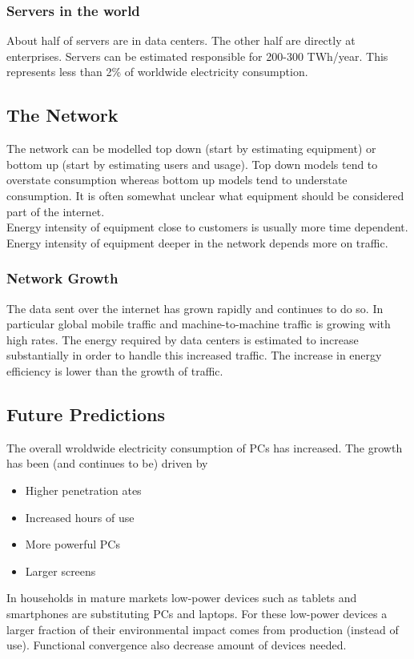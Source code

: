 \subsubsection{Servers in the world}
About half of servers are in data centers.
The other half are directly at enterprises.
Servers can be estimated responsible for 200-300 TWh/year.
This represents less than 2\% of worldwide electricity consumption.

\subsection{The Network}
The network can be modelled top down (start by estimating equipment) or bottom up (start by estimating users and usage).
Top down models tend to overstate consumption whereas bottom up models tend to understate consumption.
It is often somewhat unclear what equipment should be considered part of the internet.\\

Energy intensity of equipment close to customers is usually more time dependent.
Energy intensity of equipment deeper in the network depends more on traffic.

\subsubsection{Network Growth}
The data sent over the internet has grown rapidly and continues to do so.
In particular global mobile traffic and machine-to-machine traffic is growing with high rates.
The energy required by data centers is estimated to increase substantially in order to handle this increased traffic.
The increase in energy efficiency is lower than the growth of traffic.

\subsection{Future Predictions}
The overall wroldwide electricity consumption of PCs has increased.
The growth has been (and continues to be) driven by

\begin{itemize}
    \item Higher penetration ates
    \item Increased hours of use
    \item More powerful PCs
    \item Larger screens
\end{itemize}

In households in mature markets low-power devices such as tablets and smartphones are substituting PCs and laptops.
For these low-power devices a larger fraction of their environmental impact comes from production (instead of use).
Functional convergence also decrease amount of devices needed.




